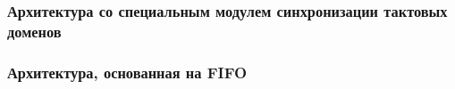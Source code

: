 
\subsubsection{Архитектура со специальным модулем синхронизации тактовых доменов}


\subsubsection{Архитектура, основанная на FIFO}

